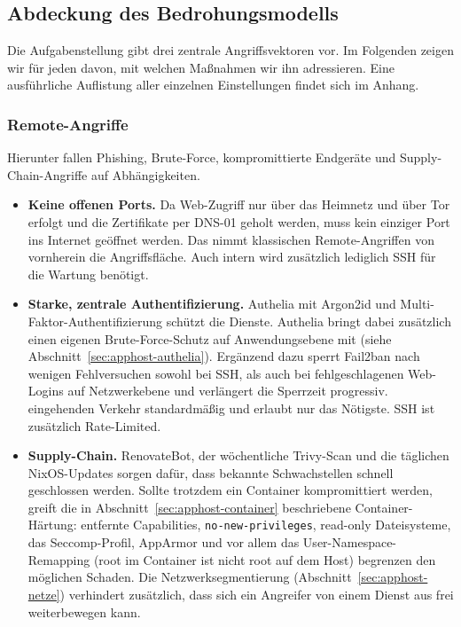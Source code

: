 \subsection{Abdeckung des Bedrohungsmodells} \label{sec:gefahrenmodell}

Die Aufgabenstellung gibt drei zentrale Angriffsvektoren vor. Im Folgenden
zeigen wir für jeden davon, mit welchen Maßnahmen wir ihn adressieren. Eine
ausführliche Auflistung aller einzelnen Einstellungen findet sich im Anhang.

\subsubsection{Remote-Angriffe}

Hierunter fallen Phishing, Brute-Force, kompromittierte Endgeräte und
Supply-Chain-Angriffe auf Abhängigkeiten.

\begin{itemize}
  \item \textbf{Keine offenen Ports.} Da Web-Zugriff nur über das Heimnetz
    und über Tor erfolgt und die Zertifikate per \ac{DNS}-01 geholt
    werden, muss kein einziger Port ins Internet geöffnet werden. Das nimmt
    klassischen Remote-Angriffen von vornherein die Angriffsfläche. Auch intern wird zusätzlich lediglich \ac{SSH} für die Wartung benötigt.
  \item \textbf{Starke, zentrale Authentifizierung.} Authelia mit Argon2id und
    Multi-Faktor-Authentifizierung schützt die Dienste. Authelia bringt dabei
    zusätzlich einen eigenen Brute-Force-Schutz auf Anwendungsebene mit (siehe Abschnitt~\ref{sec:apphost-authelia}).
    Ergänzend dazu sperrt Fail2ban nach wenigen Fehlversuchen sowohl bei
    SSH, als auch bei fehlgeschlagenen Web-Logins auf
    Netzwerkebene und verlängert die Sperrzeit progressiv.
    eingehenden Verkehr standardmäßig und erlaubt nur das Nötigste. SSH ist
    zusätzlich Rate-Limited.
  \item \textbf{Supply-Chain.} RenovateBot, der wöchentliche Trivy-Scan und die
    täglichen NixOS-Updates sorgen dafür, dass bekannte Schwachstellen schnell
    geschlossen werden. Sollte trotzdem ein Container kompromittiert werden,
    greift die in Abschnitt~\ref{sec:apphost-container} beschriebene
    Container-Härtung: entfernte Capabilities, \texttt{no-new-privileges},
    read-only Dateisysteme, das Seccomp-Profil, AppArmor und vor allem das
    User-Namespace-Remapping (root im Container ist nicht root auf dem Host)
    begrenzen den möglichen Schaden. Die Netzwerksegmentierung
    (Abschnitt~\ref{sec:apphost-netze}) verhindert zusätzlich, dass sich ein
    Angreifer von einem Dienst aus frei weiterbewegen kann.
\end{itemize}


